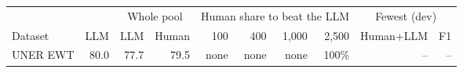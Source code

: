 \begin{tabular}{lrrrrrrrrr}
\toprule
 & & \multicolumn{2}{c}{Whole pool} & \multicolumn{4}{c}{Human share to beat the LLM} & \multicolumn{2}{c}{Fewest (dev)} \\
Dataset & LLM & LLM & Human & 100 & 400 & 1{,}000 & 2{,}500 & Human+LLM & F1 \\
\midrule
UNER EWT & 80.0 & 77.7 & 79.5 & none & none & none & 100\% & -- & -- \\
\bottomrule
\end{tabular}

